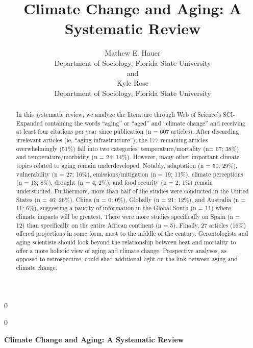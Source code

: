 \documentclass[12pt]{article}
\newcommand{\blind}{0}
\begin{document}
\def\spacingset#1{\renewcommand{\baselinestretch}%
{#1}\small\normalsize} \spacingset{1}



\blind
{
  \title{\bf Climate Change and Aging: A Systematic Review}

  \author{
        Mathew E. Hauer \\
    Department of Sociology, Florida State University\\
     and \\     Kyle Rose \\
    Department of Sociology, Florida State University\\
      }
  \maketitle
} \fi

\blind
{
  \bigskip
  \bigskip
  \bigskip
  \begin{center}
    {\LARGE\bf Climate Change and Aging: A Systematic Review}
  \end{center}
  \medskip
} \fi

\bigskip
\begin{abstract}
In this systematic review, we analyze the literature through Web of
Science's SCI-Expanded containing the words ``aging'' or ``aged'' and
``climate change'' and receiving at least four citations per year since
publication (n = 607 articles). After discarding irrelevant articles
(ie, ``aging infrastructure''), the 177 remaining articles
overwhelmingly (51\%) fall into two categories: temperature/mortality
(n= 67; 38\%) and temperature/morbidity (n = 24; 14\%). However, many
other important climate topics related to aging remain underdeveloped.
Notably, adaptation (n = 50; 29\%), vulnerability (n = 27; 16\%),
emissions/mitigation (n = 19; 11\%), climate perceptions (n = 13; 8\%),
drought (n = 4; 2\%), and food security (n = 2; 1\%) remain
understudied. Furthermore, more than half of the studies were conducted
in the United States (n = 46; 26\%), China (n = 0; 0\%), Globally (n =
21; 12\%), and Australia (n = 11; 6\%), suggesting a paucity of
information in the Global South (n = 11) where climate impacts will be
greatest. There were more studies specifically on Spain (n = 12) than
specifically on the entire African continent (n = 5). Finally, 27
articles (16\%) offered projections in some form, most to the middle of
the century. Gerontologists and aging scientists should look beyond the
relationship between heat and mortality to offer a more holistic view of
aging and climate change. Prospective analyses, as opposed to
retrospective, could shed additional light on the link between aging and
climate change.
\end{abstract}
\end{document}
